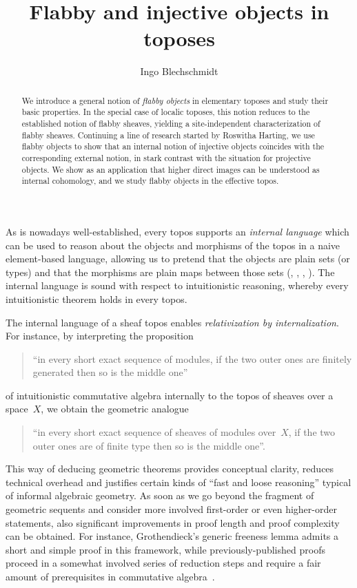 \documentclass[oneside]{amsart}
\title{Flabby and injective objects in toposes}
\author{Ingo Blechschmidt}
\theoremstyle{definition}
\theoremstyle{plain}
\theoremstyle{remark}
\renewcommand{\_}{\mathpunct{.}\,}
\newcommand{\effective}{ef{}fective\xspace}
\begin{document}
\begin{abstract}
  We introduce a general notion of \emph{flabby objects} in elementary toposes
  and study their basic properties. In the special case of localic toposes, this
  notion reduces to the established notion of flabby sheaves, yielding a
  site-independent characterization of flabby sheaves. Continuing a line of
  research started by Roswitha Harting, we use flabby objects to
  show that an internal notion of injective objects coincides with the
  corresponding external notion, in stark contrast with the situation for
  projective objects. We show as an application that higher direct images can
  be understood as internal cohomology, and we study flabby objects in the
  \effective topos.
\end{abstract}

\maketitle
\thispagestyle{empty}

\noindent
As is nowadays well-established, every topos supports an \emph{internal language}
which can be used to reason about the objects and morphisms of the topos in a
naive element-based language, allowing us to pretend that the objects are plain
sets (or types) and that the morphisms are plain maps between those sets
(\cite[Chapter~6]{borceux:handbook3}, \cite[Section~1.3]{caramello:ttt},
\cite[Chapter~14]{goldblatt:topoi},
\cite[Chapter~VI]{moerdijk-maclane:sheaves-logic}). The internal language is
sound with respect to intuitionistic reasoning, whereby every intuitionistic
theorem holds in every topos.

The internal language of a sheaf topos enables \emph{relativization by
internalization}. For instance, by interpreting the
proposition \begin{quote}``in every short exact sequence of modules, if the two
outer ones are finitely generated then so is the middle one''\end{quote} of
intuitionistic commutative algebra internally to the topos of sheaves over a
space~$X$, we obtain the geometric analogue \begin{quote}``in every short exact
sequence of sheaves of modules over~$X$, if the two outer ones are of finite
type then so is the middle one''.\end{quote}
This way of deducing geometric theorems provides conceptual clarity, reduces
technical overhead and justifies certain kinds of ``fast and loose reasoning''
typical of informal algebraic geometry. As soon as we go beyond the fragment of
geometric sequents and consider more involved first-order or even higher-order
statements, also significant improvements in proof length and proof complexity
can be obtained. For instance, Grothendieck's generic freeness lemma admits a
short and simple proof in this framework, while previously-published proofs
proceed in a somewhat involved series of reduction steps and require a fair
amount of prerequisites in commutative
algebra~\cite{blechschmidt:phd,blechschmidt:generic-freeness}.
\end{document}
